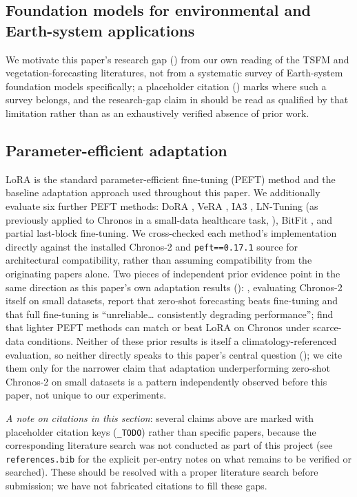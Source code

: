 \documentclass[11pt]{article}
\begin{document}
\subsection{Foundation models for environmental and Earth-system applications}
\label{sec:related-earth}
We motivate this paper's research gap () from our own reading of the TSFM and
vegetation-forecasting literatures, not from a systematic survey of Earth-system foundation models
specifically; a placeholder citation (\cite{earth_system_fm_TODO}) marks where such a survey
belongs, and the research-gap claim in  should be read as qualified by that
limitation rather than as an exhaustively verified absence of prior work.

\subsection{Parameter-efficient adaptation}
\label{sec:related-peft}
LoRA \citep{hu2022lora} is the standard parameter-efficient fine-tuning (PEFT) method and the
baseline adaptation approach used throughout this paper. We additionally evaluate six further PEFT
methods: DoRA \citep{liu2024dora}, VeRA \citep{kopiczko2024vera}, IA3 \citep{liu2022ia3},
LN-Tuning (as previously applied to Chronos in a small-data healthcare task,
\citealp{arxiv2409.11302}), BitFit \citep{zaken2022bitfit}, and partial last-block fine-tuning. We
cross-checked each method's implementation directly against the installed Chronos-2 and
\texttt{peft==0.17.1} source for architectural compatibility, rather than assuming compatibility
from the originating papers alone. Two pieces of independent prior evidence point in the same
direction as this paper's own adaptation results ():
\citet{arxiv2607.23146}, evaluating Chronos-2 itself on small datasets, report that zero-shot
forecasting beats fine-tuning and that full fine-tuning is ``unreliable\ldots{} consistently
degrading performance''; \citet{arxiv2409.11302} find that lighter PEFT methods can match or beat
LoRA on Chronos under scarce-data conditions. Neither of these prior results is itself a
climatology-referenced evaluation, so neither directly speaks to this paper's central question
(); we cite them only for the narrower claim that adaptation
underperforming zero-shot Chronos-2 on small datasets is a pattern independently observed before
this paper, not unique to our experiments.

\emph{A note on citations in this section}: several claims above are marked with placeholder
citation keys (\texttt{\_TODO}) rather than specific papers, because the corresponding literature
search was not conducted as part of this project (see \texttt{references.bib} for the explicit
per-entry notes on what remains to be verified or searched). These should be resolved with a
proper literature search before submission; we have not fabricated citations to fill these gaps.
\end{document}
